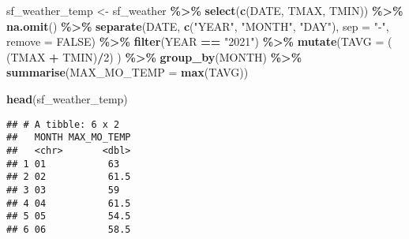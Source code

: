 \documentclass[
]{article}
\newenvironment{Shaded}{\begin{snugshade}}{\end{snugshade}}
\newcommand{\AttributeTok}[1]{\textcolor[rgb]{0.13,0.29,0.53}{#1}}
\newcommand{\ConstantTok}[1]{\textcolor[rgb]{0.56,0.35,0.01}{#1}}
\newcommand{\DecValTok}[1]{\textcolor[rgb]{0.00,0.00,0.81}{#1}}
\newcommand{\FunctionTok}[1]{\textcolor[rgb]{0.13,0.29,0.53}{\textbf{#1}}}
\newcommand{\NormalTok}[1]{#1}
\newcommand{\OtherTok}[1]{\textcolor[rgb]{0.56,0.35,0.01}{#1}}
\newcommand{\SpecialCharTok}[1]{\textcolor[rgb]{0.81,0.36,0.00}{\textbf{#1}}}
\newcommand{\StringTok}[1]{\textcolor[rgb]{0.31,0.60,0.02}{#1}}
\begin{document}
\begin{Shaded}
\begin{Highlighting}[]
\NormalTok{sf\_weather\_temp }\OtherTok{\textless{}{-}}\NormalTok{ sf\_weather }\SpecialCharTok{\%\textgreater{}\%}
  \FunctionTok{select}\NormalTok{(}\FunctionTok{c}\NormalTok{(DATE, TMAX, TMIN)) }\SpecialCharTok{\%\textgreater{}\%}
  \FunctionTok{na.omit}\NormalTok{() }\SpecialCharTok{\%\textgreater{}\%}
  \FunctionTok{separate}\NormalTok{(DATE, }\FunctionTok{c}\NormalTok{(}\StringTok{"YEAR"}\NormalTok{, }\StringTok{"MONTH"}\NormalTok{, }\StringTok{"DAY"}\NormalTok{), }\AttributeTok{sep =} \StringTok{"{-}"}\NormalTok{, }\AttributeTok{remove =} \ConstantTok{FALSE}\NormalTok{) }\SpecialCharTok{\%\textgreater{}\%}
  \FunctionTok{filter}\NormalTok{(YEAR }\SpecialCharTok{==} \StringTok{"2021"}\NormalTok{) }\SpecialCharTok{\%\textgreater{}\%}
  \FunctionTok{mutate}\NormalTok{(}\AttributeTok{TAVG =}\NormalTok{ ( (TMAX }\SpecialCharTok{+}\NormalTok{ TMIN)}\SpecialCharTok{/}\DecValTok{2}\NormalTok{) ) }\SpecialCharTok{\%\textgreater{}\%}
  \FunctionTok{group\_by}\NormalTok{(MONTH) }\SpecialCharTok{\%\textgreater{}\%}
  \FunctionTok{summarise}\NormalTok{(}\AttributeTok{MAX\_MO\_TEMP =} \FunctionTok{max}\NormalTok{(TAVG))}

\FunctionTok{head}\NormalTok{(sf\_weather\_temp)}
\end{Highlighting}
\end{Shaded}

\begin{verbatim}
## # A tibble: 6 x 2
##   MONTH MAX_MO_TEMP
##   <chr>       <dbl>
## 1 01           63  
## 2 02           61.5
## 3 03           59  
## 4 04           61.5
## 5 05           54.5
## 6 06           58.5
\end{verbatim}
\end{document}
